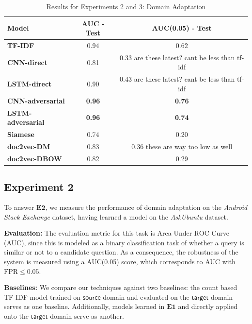 \documentclass{sigkddExp}
\begin{document}
\begin{table}[h]
    \begin{tabular}{ l  c  c}
    \toprule
    \textbf{Model}
    & \textbf{AUC - Test}
    & \textbf{AUC(0.05) - Test}
    \\
    \toprule
    \textbf{TF-IDF}
    & 0.94
    & 0.62
    \\
    \cmidrule{1-1} 
    \textbf{CNN-direct}
    & 0.81
    & 0.33 {\color{red} are these latest? cant be less than tf-idf}
    \\
    \cmidrule{1-1} 
    \textbf{LSTM-direct}
    & 0.90
    & 0.43 {\color{red} are these latest? cant be less than tf-idf}
    \\
    \midrule
    \textbf{CNN-adversarial}
    & \textbf{0.96}
    & \textbf{0.76}
    \\
    \cmidrule{1-1} 
    \textbf{LSTM-adversarial}
    & \textbf{0.96}
    & \textbf{0.74}
    \\
    \midrule
    \textbf{Siamese}
    & 0.74
    & 0.20
    \\
    \cmidrule{1-1} 
    \textbf{doc2vec-DM}
    & 0.83
    & 0.36 {\color{red} these are way too low as well}
    \\
    \cmidrule{1-1}
    \textbf{doc2vec-DBOW}
    & 0.82
    & 0.29    
    \\
    \bottomrule
    \end{tabular}
    \caption{Results for Experiments 2 and 3: Domain Adaptation}
    \label{tab:exp23}
\end{table}

\subsection{Experiment 2} 
To answer $\mathbf{E2}$, we measure the performance of domain adaptation on the \textit{Android Stack Exchange} dataset, having learned a model on the \textit{AskUbuntu} dataset.

\textbf{Evaluation:} The evaluation metric for this task is Area Under ROC Curve (AUC), since this is modeled as a binary classification task of whether a query is similar or not to a candidate question. As a consequence, the robustness of the system is measured using a AUC(0.05) score, which corresponds to AUC with $\mathrm{FPR} \leq 0.05$.

\textbf{Baselines:} We compare our techniques against two baselines: the count based TF-IDF model trained on $\textsf{source}$ domain and evaluated on the $\textsf{target}$ domain serves as one baseline. Additionally, models learned in $\mathbf{E1}$ and directly applied onto the $\textsf{target}$ domain serve as another.
\end{document}
